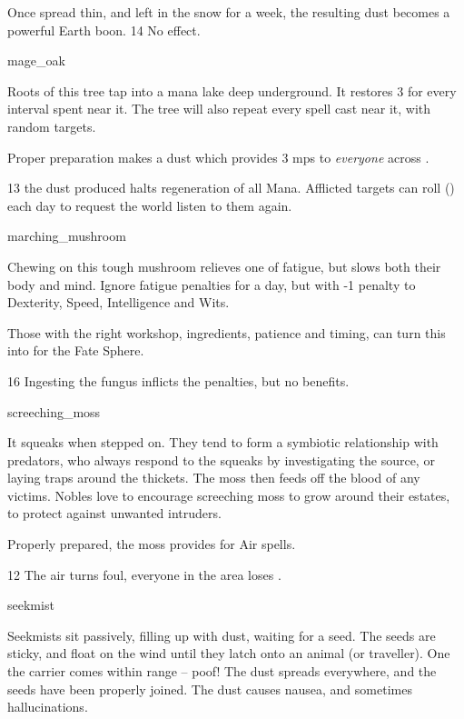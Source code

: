 \begin{multicols}{2}
{  Once spread thin, and left in the snow for a week, the resulting dust becomes a powerful Earth \gls{boon}.
    }
{}%
{14}%
{No effect.}%

%
  {mage_oak}%
  {
    Roots of this tree tap into a mana lake deep underground.
    It restores 3  for every \gls{interval} spent near it.
    The tree will also repeat every spell cast near it, with random targets.

    Proper preparation makes a dust which provides 3 \glspl{mp} to \emph{everyone} across .
  }%
  {}%
  {13}%
  {the dust produced halts regeneration of all Mana.
  Afflicted targets can roll  (\tn[10]) each day to request the world listen to them again.}


%
  {marching_mushroom}%
  {
  Chewing on this tough mushroom relieves one of fatigue, but slows both their body and mind.
    Ignore \gls{fatigue} penalties for a day, but with -1 penalty to Dexterity, Speed, Intelligence and Wits.

    Those with the right workshop, ingredients, patience and timing, can turn this into  for the Fate Sphere.
    }
{}%
{16}%
{Ingesting the fungus inflicts the penalties, but no benefits.}%

%
  {screeching_moss}%
  {
  It squeaks when stepped on.
  They tend to form a symbiotic relationship with predators, who always respond to the squeaks by investigating the source, or laying traps around the thickets.
  The moss then feeds off the blood of any victims.
  Nobles love to encourage screeching moss to grow around their estates, to protect against unwanted intruders.

  Properly prepared, the moss provides  for Air spells.
    }
  {}%
  {12}%
  {The air turns foul, everyone in the \gls{area} loses .}%

%
  {seekmist}%
  {
  Seekmists sit passively, filling up with dust, waiting for a seed.
  The seeds are sticky, and float on the wind until they latch onto an animal (or traveller).
  One the carrier comes within range -- poof!
  The dust spreads everywhere, and the seeds have been properly joined.
  The dust causes nausea, and sometimes hallucinations.

}
\end{multicols}
